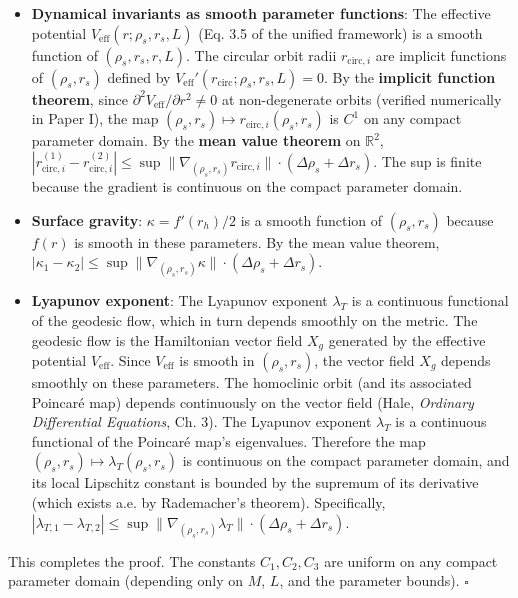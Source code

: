 \documentclass[
]{article}
\begin{document}
\begin{itemize}
\item
  \textbf{Dynamical invariants as smooth parameter functions}: The
  effective potential \(V_{\text{eff}}(r; \rho_s, r_s, L)\) (Eq. 3.5 of
  the unified framework) is a smooth function of
  \((\rho_s, r_s, r, L)\). The circular orbit radii
  \(r_{\text{circ},i}\) are implicit functions of \((\rho_s, r_s)\)
  defined by \(V_{\text{eff}}'(r_{\text{circ}}; \rho_s, r_s, L) = 0\).
  By the \textbf{implicit function theorem}, since
  \(\partial^2 V_{\text{eff}}/\partial r^2 \neq 0\) at non-degenerate
  orbits (verified numerically in Paper I), the map
  \((\rho_s, r_s) \mapsto r_{\text{circ},i}(\rho_s, r_s)\) is \(C^1\) on
  any compact parameter domain. By the \textbf{mean value theorem} on
  \(\mathbb{R}^2\),
  \(|r_{\text{circ},i}^{(1)} - r_{\text{circ},i}^{(2)}| \leq \sup \|\nabla_{(\rho_s, r_s)} r_{\text{circ},i}\| \cdot (\Delta\rho_s + \Delta r_s)\).
  The sup is finite because the gradient is continuous on the compact
  parameter domain.
\item
  \textbf{Surface gravity}: \(\kappa = f'(r_h)/2\) is a smooth function
  of \((\rho_s, r_s)\) because \(f(r)\) is smooth in these parameters.
  By the mean value theorem,
  \(|\kappa_1 - \kappa_2| \leq \sup \|\nabla_{(\rho_s, r_s)} \kappa\| \cdot (\Delta\rho_s + \Delta r_s)\).
\item
  \textbf{Lyapunov exponent}: The Lyapunov exponent \(\lambda_T\) is a
  continuous functional of the geodesic flow, which in turn depends
  smoothly on the metric. The geodesic flow is the Hamiltonian vector
  field \(X_{g}\) generated by the effective potential
  \(V_{\text{eff}}\). Since \(V_{\text{eff}}\) is smooth in
  \((\rho_s, r_s)\), the vector field \(X_{g}\) depends smoothly on
  these parameters. The homoclinic orbit (and its associated Poincaré
  map) depends continuously on the vector field (Hale, \emph{Ordinary
  Differential Equations}, Ch. 3). The Lyapunov exponent \(\lambda_T\)
  is a continuous functional of the Poincaré map's eigenvalues.
  Therefore the map \((\rho_s, r_s) \mapsto \lambda_T(\rho_s, r_s)\) is
  continuous on the compact parameter domain, and its local Lipschitz
  constant is bounded by the supremum of its derivative (which exists
  a.e. by Rademacher's theorem). Specifically,
  \(|\lambda_{T,1} - \lambda_{T,2}| \leq \sup \|\nabla_{(\rho_s, r_s)} \lambda_T\| \cdot (\Delta\rho_s + \Delta r_s)\).
\end{itemize}

This completes the proof. The constants \(C_1, C_2, C_3\) are uniform on
any compact parameter domain (depending only on \(M\), \(L\), and the
parameter bounds). \(\square\)
\end{document}
